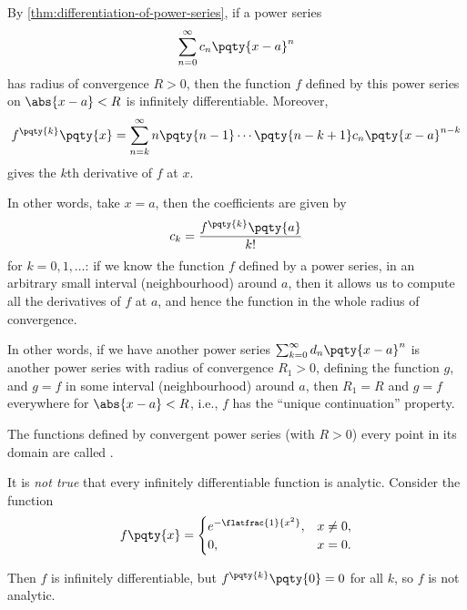 \begin{remark}
    By \autoref{thm:differentiation-of-power-series}, if a power series
    \[
        \sum_{n = 0}^{\infty} c_n \pqty{x - a}^n
    \]
    has radius of convergence \(R > 0\), then the function \(f\) defined by this power series on \(\abs{x - a} < R\) is infinitely differentiable. Moreover,
    \[
        f^{\pqty{k}}\pqty{x} = \sum_{n = k}^{\infty} n \pqty{n - 1} \cdots \pqty{n - k + 1} c_n \pqty{x - a}^{n - k}
    \]
    gives the \(k\)th derivative of \(f\) at \(x\).

    In other words, take \(x = a\), then the coefficients are given by
    \[
        c_k = \frac{f^{\pqty{k}}\pqty{a}}{k!}
    \]
    for \(k = 0, 1, \ldots\): if we know the function \(f\) defined by a power series, in an arbitrary small interval (neighbourhood) around \(a\), then it allows us to compute all the derivatives of \(f\) at \(a\), and hence the function in the whole radius of convergence.

    In other words, if we have another power series \(\sum_{k = 0}^{\infty} d_n \pqty{x - a}^n\) is another power series with radius of convergence \(R_1 > 0\), defining the function \(g\), and \(g = f\) in some interval (neighbourhood) around \(a\), then \(R_1 = R\) and \(g = f\) everywhere for \(\abs{x - a} < R\), i.e., \(f\) has the ``unique continuation'' property.
\end{remark}

\begin{definition}
    The functions defined by convergent power series (with \(R > 0\)) every point in its domain are called .
\end{definition}

\begin{remark}
    It is \emph{not true} that every infinitely differentiable function is analytic. Consider the function
    \[
        f\pqty{x} = \begin{cases}
            e^{-\flatfrac{1}{x^2}}, & x \neq 0, \\
            0, & x = 0.
        \end{cases}
    \]

    Then \(f\) is infinitely differentiable, but \(f^{\pqty{k}}\pqty{0} = 0\) for all \(k\), so \(f\) is not analytic.
\end{remark}
